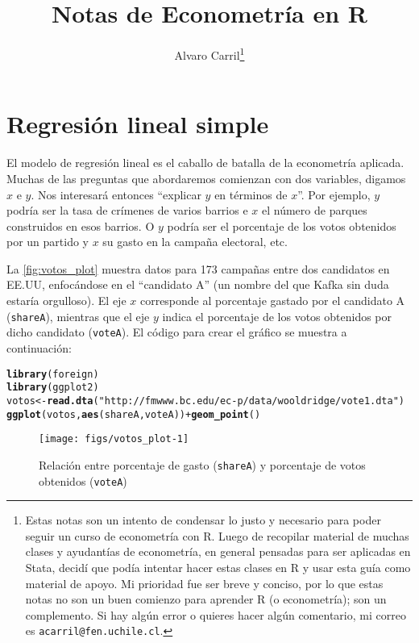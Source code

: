 \documentclass{report}\usepackage[]{graphicx}\usepackage[]{color}
\title{Notas de Econometría en R}
\author{Alvaro Carril\thanks{Estas notas son un intento de condensar lo justo y necesario para poder seguir un curso de econometría con R.
Luego de recopilar material de muchas clases y ayudantías de econometría, en general pensadas para ser aplicadas en Stata, decidí que podía intentar hacer estas clases en R y usar esta guía como material de apoyo.
Mi prioridad fue ser breve y conciso, por lo que estas notas no son un buen comienzo para aprender R (o econometría); son un complemento.
Si hay algún error o quieres hacer algún comentario, mi correo es \texttt{acarril@fen.uchile.cl}.}}
\makeatletter
\newcommand{\hlstr}[1]{\textcolor[rgb]{0.192,0.494,0.8}{#1}}%
\newcommand{\hlopt}[1]{\textcolor[rgb]{0,0,0}{#1}}%
\newcommand{\hlstd}[1]{\textcolor[rgb]{0.345,0.345,0.345}{#1}}%
\newcommand{\hlkwb}[1]{\textcolor[rgb]{0.69,0.353,0.396}{#1}}%
\newcommand{\hlkwd}[1]{\textcolor[rgb]{0.737,0.353,0.396}{\textbf{#1}}}%
\newenvironment{kframe}{%
 \def\at@end@of@kframe{}%
 \ifinner\ifhmode%
  \def\at@end@of@kframe{\end{minipage}}%
  \begin{minipage}{\columnwidth}%
 \fi\fi%
 \def\FrameCommand##1{\hskip\@totalleftmargin \hskip-\fboxsep
 \colorbox{shadecolor}{##1}\hskip-\fboxsep
     \hskip-\linewidth \hskip-\@totalleftmargin \hskip\columnwidth}%
 \MakeFramed {\advance\hsize-\width
   \@totalleftmargin\z@ \linewidth\hsize
   \@setminipage}}%
 {\par\unskip\endMakeFramed%
 \at@end@of@kframe}
\newenvironment{knitrout}{}{} %
\makeatother
\begin{document}
\maketitle
\tableofcontents

\clearpage





\chapter{Regresión lineal simple}



El modelo de regresión lineal es el caballo de batalla de la econometría aplicada.
Muchas de las preguntas que abordaremos comienzan con dos variables, digamos $x$ e $y$. Nos interesará entonces ``explicar $y$ en términos de $x$''.
Por ejemplo, $y$ podría ser la tasa de crímenes de varios barrios e $x$ el número de parques construidos en esos barrios.
O $y$ podría ser el porcentaje de los votos obtenidos por un partido y $x$ su gasto en la campaña electoral, etc.

La \autoref{fig:votos_plot} muestra datos para 173 campañas entre dos candidatos en EE.UU, enfocándose en el ``candidato A'' (un nombre del que Kafka sin duda estaría orgulloso).
El eje $x$ corresponde al porcentaje gastado por el candidato A (\verb|shareA|), mientras que el eje $y$ indica el porcentaje de los votos obtenidos por dicho candidato (\verb|voteA|).
El código para crear el gráfico se muestra a continuación:
\begin{knitrout}
\color{fgcolor}\begin{kframe}
\begin{alltt}
\hlkwd{library}\hlstd{(foreign)}
\hlkwd{library}\hlstd{(ggplot2)}
\hlstd{votos} \hlkwb{<-} \hlkwd{read.dta}\hlstd{(}\hlstr{"http://fmwww.bc.edu/ec-p/data/wooldridge/vote1.dta"}\hlstd{)}
\hlkwd{ggplot}\hlstd{(votos,} \hlkwd{aes}\hlstd{(shareA, voteA))} \hlopt{+} \hlkwd{geom_point}\hlstd{()}
\end{alltt}
\end{kframe}\begin{figure}

{\centering \texttt{[image: figs/votos\_plot-1]} 

}

\caption[Relación entre porcentaje de gasto (\texttt{shareA}) y porcentaje de votos obtenidos (\texttt{voteA})]{Relación entre porcentaje de gasto (\texttt{shareA}) y porcentaje de votos obtenidos (\texttt{voteA})}\label{fig:votos_plot}
\end{figure}


\end{knitrout}
\end{document}

